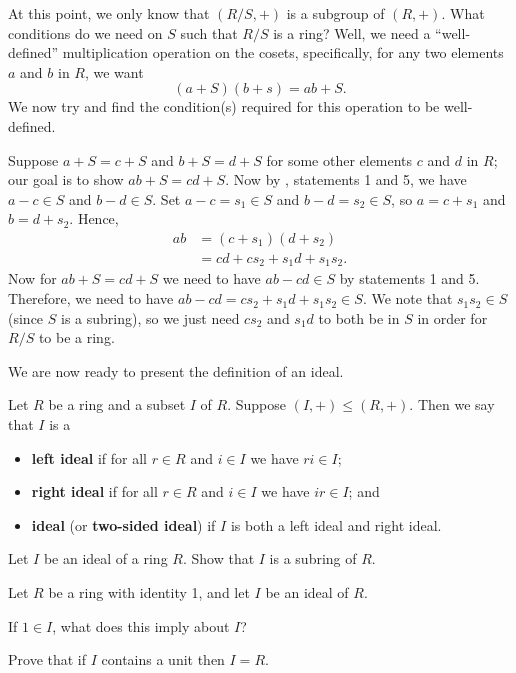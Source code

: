 At this point, we only know that $(R/S,+)$ is a subgroup of $(R,+)$. What conditions do we need on $S$ such that $R/S$ is a ring? Well, we need a ``well-defined'' multiplication operation on the cosets, specifically, for any two elements $a$ and $b$ in $R$, we want
\[
    (a+S)(b+s) = ab + S.
\]
We now try and find the condition(s) required for this operation to be well-defined.

Suppose $a+S = c+S$ and $b+S = d+S$ for some other elements $c$ and $d$ in $R$; our goal is to show $ab+S = cd+S$. Now by , statements 1 and 5, we have $a-c \in S$ and $b-d \in S$. Set $a-c = s_1 \in S$ and $b-d = s_2 \in S$, so $a = c+s_1$ and $b = d+s_2$. Hence,
\begin{align*}
    ab &= (c+s_1)(d+s_2)\\
    &= cd + cs_2 + s_1d + s_1s_2.
\end{align*}
Now for $ab + S = cd+S$ we need to have $ab-cd \in S$ by  statements 1 and 5. Therefore, we need to have $ab-cd = cs_2+s_1d+s_1s_2 \in S$. We note that $s_1s_2 \in S$ (since $S$ is a subring), so we just need $cs_2$ and $s_1d$ to both be in $S$ in order for $R/S$ to be a ring.

We are now ready to present the definition of an ideal.
\begin{definition}
    Let $R$ be a ring and a subset $I$ of $R$. Suppose $(I,+) \leq (R,+)$. Then we say that $I$ is a
    \begin{itemize}
        \item \textbf{left ideal} if for all $r \in R$ and $i \in I$ we have $ri \in I$;
        \item \textbf{right ideal} if for all $r \in R$ and $i \in I$ we have $ir \in I$; and
        \item \textbf{ideal} (or \textbf{two-sided ideal}) if $I$ is both a left ideal and right ideal.
    \end{itemize} 
\end{definition}
\begin{exercise}\label{exercise-ideal-is-a-subring}
    Let $I$ be an ideal of a ring $R$. Show that $I$ is a subring of $R$.
\end{exercise}
\begin{exercise}\label{exercise-ideal-containing-1-is-whole-ring}
    Let $R$ be a ring with identity 1, and let $I$ be an ideal of $R$.
    \begin{partquestions}{\roman*}
        \item If $1 \in I$, what does this imply about $I$?
        \item Prove that if $I$ contains a unit then $I = R$.
    \end{partquestions}
\end{exercise}


